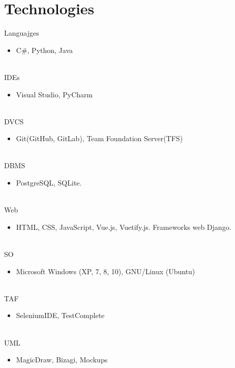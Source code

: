 \documentclass[letterpaper]{twentysecondcv} %
\begin{document}
\section{Technologies}
\begin{twenty}
	
	 \twentyitem
    	{Languajges}
		{}
        {}
        {}
        {}
        {
        {\begin{itemize}
        \item C\#, Python, Java
		\end{itemize}}
        }
        \\
	\twentyitem
    	{IDEs}
		{}
        {}
        {}
        {}
        {
        {\begin{itemize}
        \item Visual Studio, PyCharm
		\end{itemize}}
        }
        \\
        \twentyitem
    	{DVCS}
		{}
        {}
        {}
        {}
        {
        {\begin{itemize}
        \item Git(GitHub, GitLab), Team Foundation Server(TFS)
		\end{itemize}}
		}
		\\
        \twentyitem
	    {DBMS}
		{}
        {}
        {}
        {}
        {
        {\begin{itemize}
        \item PostgreSQL, SQLite.
		\end{itemize}}
		}
		\\
        \twentyitem
	    {Web}
		{}
        {}
        {}
        {}
        {
        {\begin{itemize}
        \item HTML, CSS, JavaScript, Vue.js, Vuetify.js. Frameworks web Django.
		\end{itemize}}
		}
		\\
        \twentyitem
	    {SO}
		{}
        {}
        {}
        {}
        {
        {\begin{itemize}
        \item Microsoft Windows (XP, 7, 8, 10), GNU/Linux (Ubuntu)
		\end{itemize}}
		}
		\\
        \twentyitem
	    {TAF}
		{}
        {}
        {}
        {}
        {
        {\begin{itemize}
        \item SeleniumIDE, TestComplete
		\end{itemize}}
		}
		\\
        \twentyitem
	    {UML}
		{}
        {}
        {}
        {}
        {
        {\begin{itemize}
        \item MagicDraw, Bizagi, Mockups
		\end{itemize}}
		}
\end{twenty}
\end{document}

